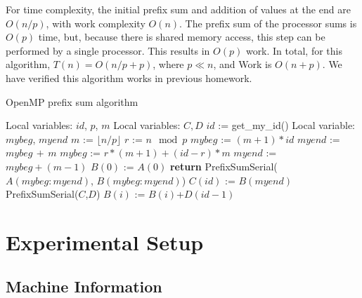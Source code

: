 \documentclass[12pt]{article}
\renewcommand{\SS}{\State}
\begin{document}
\begin{algorithm}
{{For time complexity, the initial prefix sum and addition of values at the end are
$O(n/p)$, with work complexity $O(n)$.  The prefix sum of the processor sums is
$O(p)$ time, but, because there is shared memory access, this step can be performed
by a single processor.  This results in $O(p)$ work.  In total, for this algorithm,
$T(n)=O(n/p+p)$, where $p\ll n$, and Work is $O(n+p)$. We have verified this
algorithm works in previous homework.

\begin{algorithm}[t!]
\begin{algorithmic}
    \caption{OpenMP prefix sum algorithm\label{alg:openmp}}
 
    \State {}
    \State Local variables: $id$, $p$, $m$ 
    \State Local variables: $C,D$ 
    \State $id$ := get\_my\_id() 
    \State Local variable: $mybeg$, $myend$ 
    \State $m$ := $\lfloor n/p \rfloor$ 
    \State $r$ := $n \mod p$
     
        \State $mybeg$ := $(m+1)*id$
        \State $myend$ := $mybeg\,+\,m$ 
    \Else
        \State $mybeg$ := $r*(m+1)+(id-r)*m$
        \State $myend$ := $mybeg+(m-1)$
    \EndIf
        \SS $B(0)$ := $A(0)$
        \SS \textbf{return}
    \Else
        \SS PrefixSumSerial($A(mybeg:myend)$, $B(mybeg:myend)$) 
    \EndIf
    \SS $C(id)$ := $B(myend)$ 
    \SS PrefixSumSerial($C$,$D$) 
    \Else
            \SS $B(i)$ := $B(i)$+$D(id-1)$
        \EndFor
    \EndIf {}
\EndProcedure
\end{algorithmic}
\end{algorithm}

\section{Experimental Setup}

\subsection{Machine Information}

}}
\end{algorithm}
\end{document}

